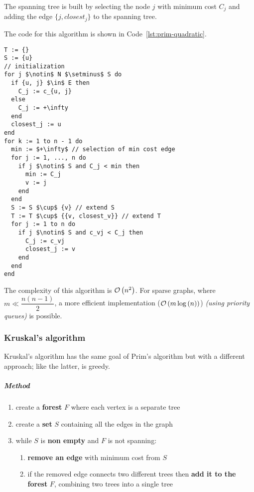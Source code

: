\documentclass[english]{article}
\begin{document}
The spanning tree is built by selecting the node \(j\) with minimum cost \(C_j\) and adding the edge \(\{j, \textit{closest}_j\}\) to the spanning tree.

\bigskip
The code for this algorithm is shown in Code~\ref{lst:prim-quadratic}.

\begin{lstlisting}[caption={Prim's algorithm in quadratic time}, label={lst:prim-quadratic}, float]
T := {}
S := {u}
// initialization
for j $\notin$ N $\setminus$ S do
  if {u, j} $\in$ E then
    C_j := c_{u, j}
  else
    C_j := +\infty
  end
  closest_j := u
end
for k := 1 to n - 1 do
  min := $+\infty$ // selection of min cost edge
  for j := 1, ..., n do
    if j $\notin$ S and C_j < min then
      min := C_j
      v := j
    end
  end
  S := S $\cup$ {v} // extend S
  T := T $\cup$ {{v, closest_v}} // extend T
  for j := 1 to n do
    if j $\notin$ S and c_vj < C_j then
      C_j := c_vj
      closest_j := v
    end
  end
end
\end{lstlisting}

\bigskip
The complexity of this algorithm is \(\mathcal{O}\left(n^2\right)\).
For sparse graphs, where \(m \ll \dfrac{n(n-1)}{2}\), a more efficient implementation (\(\mathcal{O}\left(m \log{(n)}\right)\)) \textit{(using priority queues)} is possible.

\subsubsection{Kruskal's algorithm}

Kruskal's algorithm has the same goal of Prim's algorithm but with a different approach;
like the latter, is greedy.

\subparagraph*{Method}

\begin{enumerate}
  \item create a \textbf{forest} \(F\) where each vertex is a separate tree
  \item create a \textbf{set} \(S\) containing all the edges in the graph
  \item while \(S\) is \textbf{non empty }and \(F\) is not spanning:
        \begin{enumerate}
          \item \textbf{remove an edge} with minimum cost from \(S\)
          \item if the removed edge connects two different trees then \textbf{add it to the forest} \(F\), combining two trees into a single tree
        \end{enumerate}
\end{enumerate}
\end{document}
